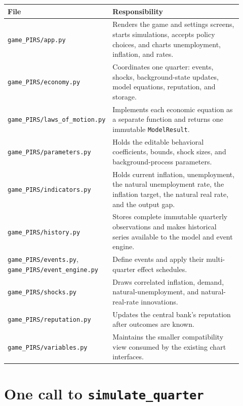 \documentclass[11pt]{article}
\newcommand{\code}[1]{\texttt{#1}}
\newcommand{\file}[1]{\texttt{game\_PIRS/#1}}
\begin{document}
\begin{center}
\begin{tabular}{@{}p{0.24\linewidth}p{0.68\linewidth}@{}}
\toprule
File & Responsibility \\
\midrule
\file{app.py} & Renders the game and settings screens, starts simulations,
accepts policy choices, and charts unemployment, inflation, and rates. \\
\file{economy.py} & Coordinates one quarter: events, shocks, background-state
updates, model equations, reputation, and storage. \\
\file{laws\_of\_motion.py} & Implements each economic equation as a separate
function and returns one immutable \code{ModelResult}. \\
\file{parameters.py} & Holds the editable behavioral coefficients, bounds,
shock sizes, and background-process parameters. \\
\file{indicators.py} & Holds current inflation, unemployment, the natural
unemployment rate, the inflation target, the natural real rate, and the output
gap. \\
\file{history.py} & Stores complete immutable quarterly observations and makes
historical series available to the model and event engine. \\
\file{events.py}, \file{event\_engine.py} & Define events and apply their
multi-quarter effect schedules. \\
\file{shocks.py} & Draws correlated inflation, demand, natural-unemployment,
and natural-real-rate innovations. \\
\file{reputation.py} & Updates the central bank's reputation after outcomes are
known. \\
\file{variables.py} & Maintains the smaller compatibility view consumed by the
existing chart interfaces. \\
\bottomrule
\end{tabular}
\end{center}

\section{One call to \code{simulate\_quarter}}
\end{document}
